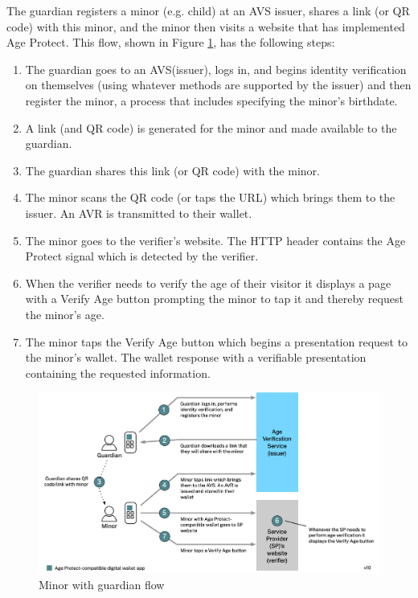 \documentclass[11pt, oneside]{article}   	%
\begin{document}
The guardian registers a minor (e.g. child) at an AVS issuer, shares a link (or QR code) with this minor, and the minor then visits a website that has implemented Age Protect. This flow, shown in Figure \ref{fig:guardian+minor}, has the following steps:
\begin{enumerate}
	\item The guardian goes to an AVS(issuer), logs in, and begins identity verification on themselves (using whatever methods are supported by the issuer) and then register the minor, a process that includes specifying the minor's birthdate.
	\item A link (and QR code) is generated for the minor and made available to the guardian.
	\item The guardian shares this link (or QR code) with the minor.
	\item The minor scans the QR code (or taps the URL) which brings them to the issuer. An AVR is transmitted to their wallet.
	\item The minor goes to the verifier's website. The HTTP header contains the Age Protect signal which is detected by the verifier.
	\item When the verifier needs to verify the age of their visitor it displays a page with a Verify Age button prompting the minor to tap it and thereby request the minor's age.
	\item The minor taps the Verify Age button which begins a presentation request to the minor's wallet. The wallet response with a verifiable presentation containing the requested information.
\end{enumerate}

\begin{figure}
	\includegraphics[width=\textwidth]{./images/guardian+minor.png}
	\caption{Minor with guardian flow}
	\label{fig:guardian+minor}
\end{figure}
\end{document}
